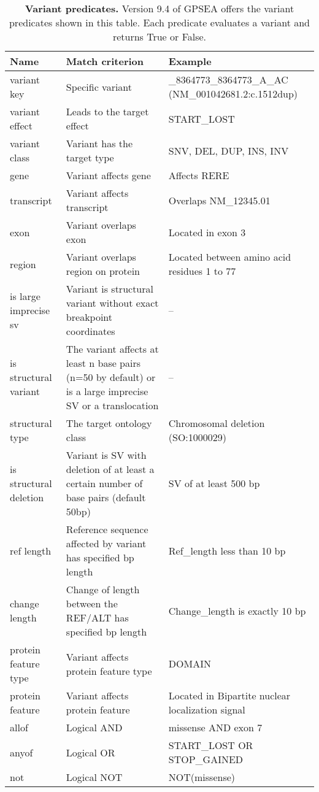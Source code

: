 
\begin{table}
\centering
\renewcommand{\arraystretch}{1.2} %
\begin{tabular}{l>{\raggedright\arraybackslash}p{6cm}>{\raggedright\arraybackslash}p{6cm}}
\toprule
\textbf{Name} & \textbf{Match criterion} & \textbf{Example}\\
\midrule
variant key & Specific variant & 1\_8364773\_8364773\_A\_AC (NM\_001042681.2:c.1512dup) \\
variant effect & Leads to the target effect & START\_LOST \\
variant class & Variant has the target type & SNV, DEL, DUP, INS, INV \\
gene & Variant affects gene & Affects RERE \\
transcript & Variant affects transcript & Overlaps NM\_12345.01 \\
exon & Variant overlaps exon & Located in exon 3 \\
region & Variant overlaps region on protein & Located between amino acid residues 1 to 77 \\
is large imprecise sv & Variant is structural variant without exact breakpoint coordinates & -- \\
is structural variant & The variant affects at least n base pairs (n=50 by default) or is a large imprecise SV or a translocation & -- \\
structural type & The target ontology class & Chromosomal deletion (SO:1000029) \\
is structural deletion & Variant is SV with deletion of at least a certain number of base pairs (default 50bp) & SV of at least 500 bp \\
ref length & Reference sequence affected by variant has specified bp length & Ref\_length less than 10 bp \\
change length & Change of length between the REF/ALT has specified bp length & Change\_length is exactly 10 bp \\
protein feature type & Variant affects protein feature type & DOMAIN \\
protein feature & Variant affects protein feature & Located in Bipartite nuclear localization signal \\
allof & Logical AND & missense AND exon 7 \\
anyof & Logical OR & START\_LOST OR STOP\_GAINED \\
not & Logical NOT & NOT(missense) \\
\bottomrule
\end{tabular}
\caption{\textbf{Variant predicates.} Version 9.4 of GPSEA offers the variant predicates shown in this table. Each predicate evaluates a variant and returns True or False.}
\label{tab:varpredicates}
\end{table}
\clearpage
\newpage

\clearpage
\newpage

